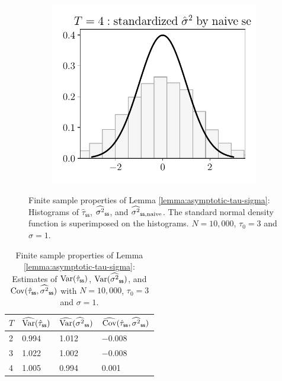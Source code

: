 \begin{figure}[h!]
\begin{subfigure}{0.3\textwidth}
	\end{subfigure}
	\begin{subfigure}{0.3\textwidth}
		\centering
		\includegraphics[width=1\linewidth]{plots/simulation/sigma_T_4_wrong.pdf}
	\end{subfigure}
	\caption{Finite sample properties of Lemma \ref{lemma:asymptotic-tau-sigma}: Histograms of $\hat{\tau}_{\mathsf{ss}}$, $\widehat{\sigma^2}_{\mathsf{ss}}$, and $\widehat{\sigma^2}_{{\mathsf{ss}},\mathrm{naive}} $.  The standard normal density function is superimposed on the histograms. $N = 10,000$, $\tau_0 = 3$ and $\sigma=1$.}
	\label{fig:test-asymptotics}
\end{figure}



\begin{table}[h!]
    \centering
\begin{tabular}{l|p{2cm}p{2cm}p{2cm}}
\toprule
  $T$ &  $\widehat{\mathrm{Var}}(\hat{\tau}_{\mathsf{ss}})$ &  $\widehat{\mathrm{Var}}(\widehat{\sigma^2}_{\mathsf{ss}})$ &  $\widehat{\mathrm{Cov}}(\hat{\tau}_{\mathsf{ss}}, \widehat{\sigma^2}_{\mathsf{ss}})$   \\
\midrule
2 & 0.994 & 1.012 & $-0.008$ \\
3 & 1.022 & 1.002 & $-0.008$ \\
4 & 1.005 & 0.994 & 0.001 \\
\bottomrule
\end{tabular}
    \caption{Finite sample properties of Lemma \ref{lemma:asymptotic-tau-sigma}: Estimates of $\mathrm{Var}(\hat{\tau}_{\mathsf{ss}})$, $\mathrm{Var}(\widehat{\sigma^2}_{\mathsf{ss}})$, and $\mathrm{Cov}(\hat{\tau}_{\mathsf{ss}}, \widehat{\sigma^2}_{\mathsf{ss}})$ with $N = 10,000$, $\tau_0 = 3$  and $\sigma=1$. }
    \label{tab:test-asymptotics}
\end{table}

